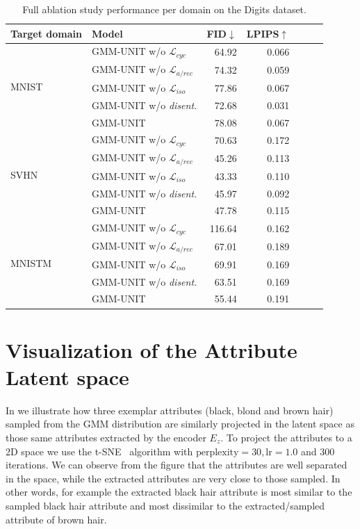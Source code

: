 \documentclass[runningheads]{llncs}
\begin{document}
\begin{table}[!ht]
    \small
	\centering
    \setlength{\tabcolsep}{4pt}
	\caption{Full ablation study performance per domain on the Digits dataset.}
	\begin{tabular}{@{}ll rrrrr@{}}
	\toprule
		\textbf{Target domain} & \textbf{Model} & \textbf{FID$\downarrow$} & \textbf{LPIPS$\uparrow$} \\
		\midrule
	    \multirow{5}{*}{MNIST} &
	     GMM-UNIT w/o $\mathcal{L}_{cyc}$ & 64.92 & 0.066 \\
		& GMM-UNIT w/o $\mathcal{L}_{a/rec}$ & \ 74.32 & 0.059 \\
	     & GMM-UNIT w/o $\mathcal{L}_{iso}$ & \ 77.86 & \ 0.067 \\
		& GMM-UNIT w/o \emph{disent.} & 72.68 & 0.031 \\
		& GMM-UNIT &   78.08 & 0.067  \\ \midrule
		\multirow{5}{*}{SVHN} &
		GMM-UNIT w/o $\mathcal{L}_{cyc}$ & 70.63 & 0.172 \\ 
		& GMM-UNIT w/o $\mathcal{L}_{a/rec}$ & 45.26 & 0.113 \\
		& GMM-UNIT w/o $\mathcal{L}_{iso}$ & 43.33 & 0.110 \\
		& GMM-UNIT w/o \emph{disent.} & 45.97 & 0.092 \\
		& GMM-UNIT & 47.78 & 0.115 \\ \midrule
		\multirow{5}{*}{MNISTM} & 
		 GMM-UNIT w/o $\mathcal{L}_{cyc}$ & 116.64 & 0.162\\
		& GMM-UNIT w/o $\mathcal{L}_{a/rec}$ & 67.01 & 0.189  \\
		& GMM-UNIT w/o $\mathcal{L}_{iso}$ & 69.91 & 0.169 \\
		& GMM-UNIT w/o \emph{disent.} & 63.51 & 0.169 \\
		& GMM-UNIT & 55.44 & 0.191  \\ 
		\bottomrule
	\end{tabular} 
	\label{tab:appendix_ablation_digits_details}
\end{table}

\section{Visualization of the Attribute Latent space}
In  we illustrate how three exemplar attributes (black, blond and brown hair) sampled from the GMM distribution are similarly projected in the latent space as those same attributes extracted by the encoder $E_z$. 
To project the attributes to a 2D space we use the t-SNE~\cite{maaten2008visualizing} algorithm with $\text{perplexity}=30, \text{lr}=1.0$ and 300 iterations. 
We can observe from the figure that the attributes are well separated in the space, while the extracted attributes are very close to those sampled. In other words, for example the extracted black hair attribute is most similar to the sampled black hair attribute and most dissimilar to the extracted/sampled attribute of brown hair.
\end{document}
